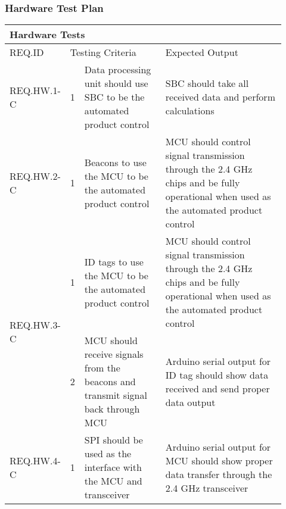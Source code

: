 \break
\subsubsection{Hardware Test Plan}

\begin{table}[h!]
    \centering
    \begin{tabular}{|m{0.15\linewidth}|m{0.02\linewidth}|m{0.3\linewidth}|m{0.45\linewidth}|} 
    \hline
    \multicolumn{4}{|l|}{Hardware Tests}           \\ 
    \hline
    REQ.ID & \multicolumn{2}{l|}{Testing Criteria} & Expected Output         \\ 
    \hline
    REQ.HW.1-C                  
    & 1 
    & Data processing unit should use SBC to be the automated product control
    & SBC should take all received data and perform calculations   \\ 
    \hline
   
    REQ.HW.2-C                  
    & 1 
    & Beacons to use the MCU to be the automated product control
    & MCU should control signal transmission through the 2.4 GHz chips and be fully operational 
    when used as the automated product control         \\ 
    \hline
    
    \multirow{2}{*}{REQ.HW.3-C} 
    & 1 
    & ID tags to use the MCU to be the automated product control
    & MCU should control signal transmission through the 2.4 GHz chips and be fully operational 
    when used as the automated product control            \\ 
    \cline{2-4}
    & 2 
    & MCU should receive signals from the beacons and transmit signal back through MCU  
    & Arduino serial output for ID tag should show data received and send proper data output        \\
    \hline
    
    REQ.HW.4-C                  
    & 1 
    & SPI should be used as the interface with the MCU and transceiver
    & Arduino serial output for MCU should show proper data transfer through the 2.4 GHz transceiver   \\ 
    \hline
    

\end{tabular}
\end{table}
